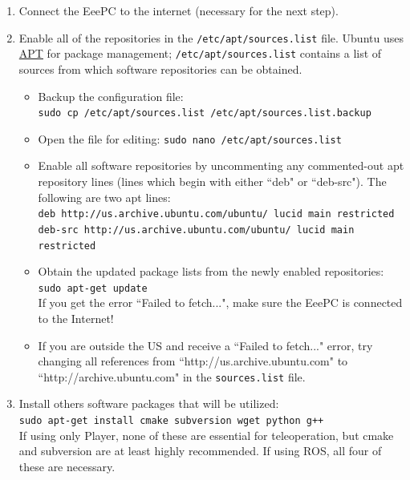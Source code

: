 \begin{enumerate}
\item Connect the EeePC to the internet (necessary for the next step).

\item \label{sec:2_enable_repos}Enable all of the repositories in the \texttt{/etc/apt/sources.list} file. Ubuntu uses \href{http://www.debian.org/doc/manuals/apt-howto/}{APT} for package management; \texttt{/etc/apt/sources.list} contains a list of sources from which software repositories can be obtained.
\begin{itemize}
\item Backup the configuration file: \\
\texttt{sudo cp /etc/apt/sources.list /etc/apt/sources.list.backup}
\item Open the file for editing: \texttt{sudo nano /etc/apt/sources.list}
\item Enable all software repositories by uncommenting any commented-out apt repository lines (lines which begin with either ``deb" or ``deb-src"). The following are two apt lines:\\
\texttt{deb http://us.archive.ubuntu.com/ubuntu/ lucid main restricted}\\
\texttt{deb-src http://us.archive.ubuntu.com/ubuntu/ lucid main restricted}
\item Obtain the updated package lists from the newly enabled repositories:\\
\texttt{sudo apt-get update}\\
If you get the error ``Failed to fetch...", make sure the EeePC is connected to the Internet!
\item If you are outside the US and receive a ``Failed to fetch..." error, try changing all references from ``http://us.archive.ubuntu.com" to ``http://archive.ubuntu.com" in the \texttt{sources.list} file.
\end{itemize}


\item Install others software packages that will be utilized: \\
\texttt{sudo apt-get install cmake subversion wget python g++}\\
If using only Player, none of these are essential for teleoperation, but cmake and subversion are at least highly recommended. If using ROS, all four of these are necessary.

\end{enumerate}


